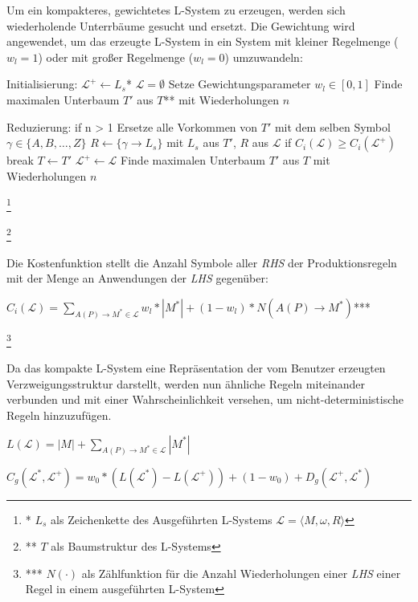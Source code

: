 \documentclass[11pt]{article}
\newcommand\blfootnote[1]{%
\begingroup
\renewcommand\thefootnote{}\footnote{#1}%
\addtocounter{footnote}{-1}%
\endgroup
}
\begin{document}
    Um ein kompakteres, gewichtetes L-System zu erzeugen, werden sich wiederholende Unterrbäume gesucht und ersetzt.
    Die Gewichtung wird angewendet, um das erzeugte L-System in ein System mit kleiner Regelmenge ($w_l=1$) oder mit
    großer Regelmenge ($w_l=0$) umzuwandeln:
    \begin{algorithm}[caption={Erstellen eines kompakten L-Systems mit Gewichtung $w_l$}, label={alg3}]
Initialisierung:
    $\mathcal{L}^+ \leftarrow L_s$*
    $\mathcal{L}=\emptyset$
    Setze Gewichtungsparameter $w_l \in [0,1]$
    Finde maximalen Unterbaum $T'$ aus $T$** mit Wiederholungen $n$

Reduzierung:
if n > 1
    Ersetze alle Vorkommen von $T'$ mit dem selben Symbol $\gamma \in \{A,B,\dots,Z\}$
    $R \leftarrow \{\gamma \rightarrow L_s\}$ mit $L_s$ aus $T'$, $R$ aus $\mathcal{L}$
    if $C_i(\mathcal{L}) \geq C_i(\mathcal{L}^+)$
        break
    $T \leftarrow T'$
    $\mathcal{L}^+ \leftarrow \mathcal{L}$
    Finde maximalen Unterbaum $T'$ aus $T$ mit Wiederholungen $n$
    \end{algorithm}
    \blfootnote{* $L_s$ als Zeichenkette des Ausgeführten L-Systems $\mathcal{L}=\langle M,\omega,R \rangle$}
    \blfootnote{** $T$ als Baumstruktur des L-Systems}

    Die Kostenfunktion stellt die Anzahl Symbole aller \textit{RHS} der Produktionsregeln mit der Menge an
    Anwendungen der \textit{LHS} gegenüber:
    \begin{algorithm}[caption={Kostenfunktion $C_i$ mit Gewichtung $w_l$}, label={alg4}]
$C_i(\mathcal{L})= \sum\limits_{A(P) \rightarrow M^* \in \mathcal{L}} w_l * |M^*| + (1 - w_l) * N(A(P)\rightarrow
M^*)$***
    \end{algorithm}
    \blfootnote{*** $N(\cdot)$ als Zählfunktion für die Anzahl Wiederholungen einer \textit{LHS} einer Regel in einem
    ausgeführten L-System}

    Da das kompakte L-System eine Repräsentation der vom Benutzer erzeugten Verzweigungsstruktur darstellt, werden
    nun ähnliche Regeln miteinander verbunden und mit einer Wahrscheinlichkeit versehen, um nicht-deterministische
    Regeln hinzuzufügen.

    \begin{algorithm}[caption={Längenfunktion $L$ für Grammatiken}, label={alg5}]
$L(\mathcal{L}) = |M| + \sum\limits_{A(P) \rightarrow M^* \in \mathcal{L}} |M^*|$
    \end{algorithm}

    \begin{algorithm}[caption={Kostenfunktion $C_g$ mit Gewichtung $w_0$}, label={alg6}]
$C_g(\mathcal{L}^*, \mathcal{L}^+) = w_0 * (L(\mathcal{L}^*) - L(\mathcal{L}^+)) + (1 - w_0) + D_g
(\mathcal{L}^+, \mathcal{L}^*)$
    \end{algorithm}
\end{document}
